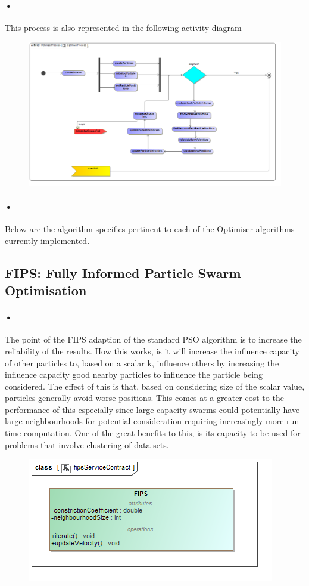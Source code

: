 \documentclass[11pt]{article}
\begin{document}
\paragraph{•}
This process is also represented in the following activity diagram
\begin{figure}[H]
	\includegraphics[scale=0.40]{OptimiserProcess.png}
\end{figure}
\paragraph{•}
Below are the algorithm specifics pertinent to each of the Optimiser algorithms currently implemented.
\subsection{FIPS: Fully Informed Particle Swarm Optimisation}
\paragraph{•}
The point of the FIPS adaption of the standard PSO algorithm is to increase the reliability of the results. How this works, is it will increase the influence capacity of other particles to, based on a scalar k, influence others by increasing the influence capacity good nearby particles to influence the particle being considered. The effect of this is that, based on considering size of the scalar value, particles generally avoid worse positions. This comes at a greater cost to the performance of this especially since large capacity swarms could potentially have large neighbourhoods for potential consideration requiring increasingly more run time computation. One of the great benefits to this, is its capacity to be used for problems that involve clustering of data sets.
\begin{figure}[h]
	\includegraphics[scale=0.45]{fipsServiceContract.png}
\end{figure}
\end{document}
